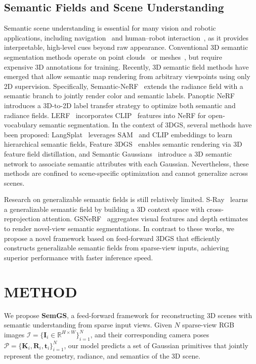 \documentclass[letterpaper, 10 pt, conference]{ieeeconf}  %
\begin{document}
\subsection{Semantic Fields and Scene Understanding}
Semantic scene understanding is essential for many vision and robotic applications, including navigation~\cite{context-navigation} and human–robot interaction~\cite{interaction}, as it provides interpretable, high-level cues beyond raw appearance.
Conventional 3D semantic segmentation methods operate on point clouds~\cite{superpoint, graph} or meshes~\cite{virtual, vmnet}, but require expensive 3D annotations for training.
Recently, 3D semantic field methods have emerged that allow semantic map rendering from arbitrary viewpoints using only 2D supervision.
Specifically, Semantic-NeRF~\cite{SemanticNeRF} extends the radiance field with a semantic branch to jointly render color and semantic labels. Panoptic NeRF~\cite{panoptic} introduces a 3D-to-2D label transfer strategy to optimize both semantic and radiance fields. LERF~\cite{LERF} incorporates CLIP~\cite{clip} features into NeRF for open-vocabulary semantic segmentation.
In the context of 3DGS, several methods have been proposed: LangSplat~\cite{Langsplat} leverages SAM~\cite{sam} and CLIP embeddings to learn hierarchical semantic fields, Feature 3DGS~\cite{feature3dgs} enables semantic rendering via 3D feature field distillation, and Semantic Gaussians~\cite{semanticgaussians} introduce a 3D semantic network to associate semantic attributes with each Gaussian. Nevertheless, these methods are confined to scene-specific optimization and cannot generalize across scenes.

Research on generalizable semantic fields is still relatively limited. S-Ray~\cite{S-Ray} learns a generalizable semantic field by building a 3D context space with cross-reprojection attention. GSNeRF~\cite{GSNeRF} aggregates visual features and depth estimates to render novel-view semantic segmentations.
In contrast to these works, we propose a novel framework based on feed-forward 3DGS that efficiently constructs generalizable semantic fields from sparse-view inputs, achieving superior performance with faster inference speed.

\section{METHOD}
We propose \textbf{SemGS}, a feed-forward framework for reconstructing 3D scenes with semantic understanding from sparse input views.
Given \( N \) sparse-view RGB images \( \mathcal{I} = \{\mathbf{I}_i \in \mathbb{R}^{H \times W} \}_{i = 1}^N \), and their corresponding camera poses \( \mathcal{P} = \{\mathbf{K}_i,\mathbf{R}_i, \mathbf{t}_i\}_{i = 1}^N \), our model predicts a set of Gaussian primitives that jointly represent the geometry, radiance, and semantics of the 3D scene.
\end{document}
